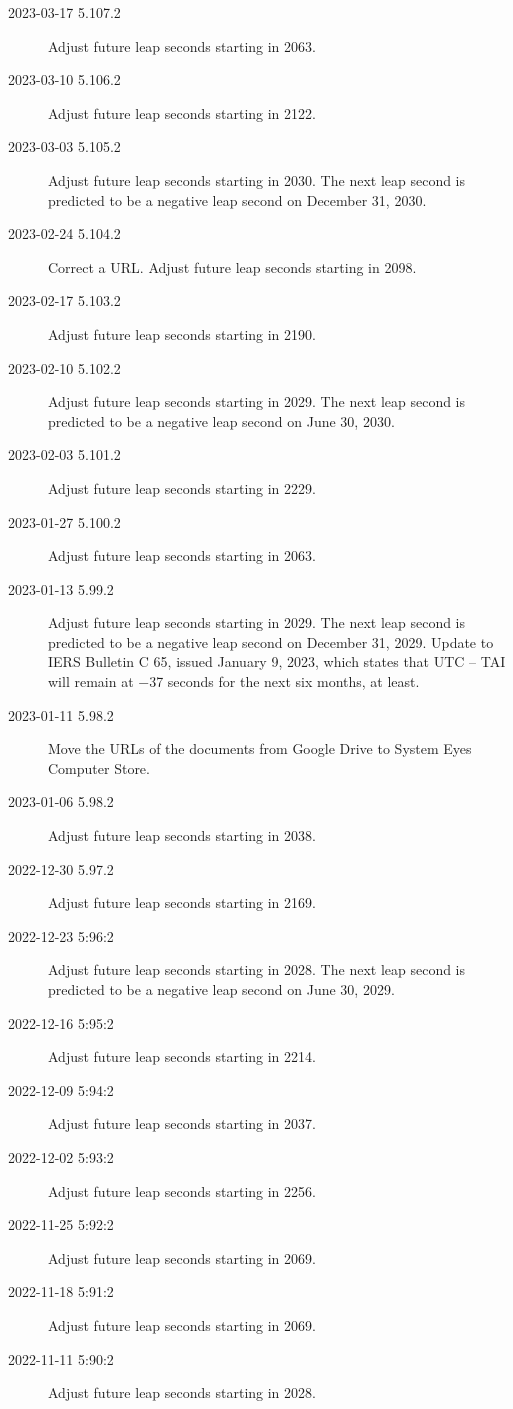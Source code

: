 \documentclass[letterpaper,twoside]{article}
\begin{document}
\begin{description}
\item[2023-03-17 5.107.2]Adjust future leap seconds starting in 2063.
\item[2023-03-10 5.106.2]Adjust future leap seconds starting in 2122.
\item[2023-03-03 5.105.2]Adjust future leap seconds starting in 2030.
  The next leap second is predicted to be a negative leap second
  on December 31, 2030.
\item[2023-02-24 5.104.2]Correct a URL.  Adjust future leap seconds
  starting in 2098.
\item[2023-02-17 5.103.2]Adjust future leap seconds starting in 2190.
\item[2023-02-10 5.102.2]Adjust future leap seconds starting in 2029.
  The next leap second is predicted to be a negative leap second
  on June 30, 2030.
\item[2023-02-03 5.101.2]Adjust future leap seconds starting in 2229.
\item[2023-01-27 5.100.2]Adjust future leap seconds starting in 2063.
\item[2023-01-13 5.99.2]Adjust future leap seconds starting in 2029.
  The next leap second is predicted to be a negative leap second
  on December 31, 2029.
  Update to IERS Bulletin C 65,
  issued January 9, 2023, which states that UTC -- TAI
  will remain at \num{-37} seconds for the next six months, at least.
\item[2023-01-11 5.98.2]Move the URLs of the documents from Google Drive
  to System Eyes Computer Store.
\item[2023-01-06 5.98.2]Adjust future leap seconds starting in 2038.
\item[2022-12-30 5.97.2]Adjust future leap seconds starting in 2169.
\item[2022-12-23 5:96:2]Adjust future leap seconds starting in 2028.
  The next leap second is predicted to be a negative leap second
  on June 30, 2029.
\item[2022-12-16 5:95:2]Adjust future leap seconds starting in 2214.
\item[2022-12-09 5:94:2]Adjust future leap seconds starting in 2037.
\item[2022-12-02 5:93:2]Adjust future leap seconds starting in 2256.
\item[2022-11-25 5:92:2]Adjust future leap seconds starting in 2069.
\item[2022-11-18 5:91:2]Adjust future leap seconds starting in 2069.
\item[2022-11-11 5:90:2]Adjust future leap seconds starting in 2028.

\end{description}
\end{document}
